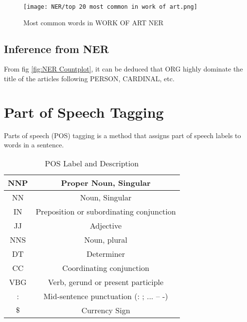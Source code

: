 \begin{figure}[H]
    \centering
    \texttt{[image: NER/top 20 most common in work of art.png]}
    \caption{Most common words in WORK OF ART NER}
    \label{fig:Most common words in WORK OF ART NER}
\end{figure}

\subsection{Inference from NER}
From fig \ref{fig:NER Countplot}, it can be deduced that ORG highly dominate the title of the articles following PERSON, CARDINAL, etc.

\section{Part of Speech Tagging}
Parts of speech (POS) tagging is a method that assigns part of speech labels to words in a sentence.




\begin{table}[H]
    \begin{center}
        \begin{tabular}{ |c|c| }
            \hline
            NNP & Proper Noun, Singular \\
            \hline
            NN & Noun, Singular \\
            \hline
            IN & Preposition or subordinating conjunction \\
            \hline
            JJ & Adjective \\
            \hline
            NNS & Noun, plural \\
            \hline
            DT & Determiner \\
            \hline
            CC & Coordinating conjunction \\
            \hline
            VBG & Verb, gerund or present participle \\
            \hline 
            : & Mid-sentence punctuation (: ; ... -- -) \\
            \hline 
            $\$$ & Currency Sign \\
            \hline
        \end{tabular}
    \end{center}
    \caption{POS Label and Description}
    \label{table:POS Label and Description}
\end{table}


